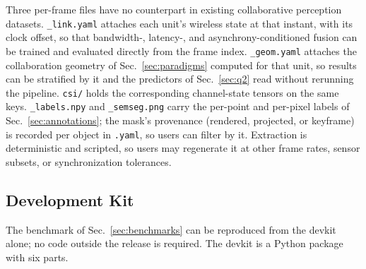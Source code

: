 \documentclass[conference]{IEEEtran}
\begin{document}
Three per-frame files have no counterpart in existing collaborative
perception datasets. \texttt{\_link.yaml} attaches each unit's
wireless state at that instant, with its clock offset, so that
bandwidth-, latency-, and asynchrony-conditioned fusion can be trained
and evaluated directly from the frame index. \texttt{\_geom.yaml}
attaches the collaboration geometry of Sec.~\ref{sec:paradigms}
computed for that unit, so results can be stratified by it and the
predictors of Sec.~\ref{sec:q2} read without rerunning the pipeline.
\texttt{csi/} holds the corresponding channel-state tensors on the
same keys. \texttt{\_labels.npy} and \texttt{\_semseg.png} carry the
per-point and per-pixel labels of Sec.~\ref{sec:annotations}; the
mask's provenance (rendered, projected, or keyframe) is recorded per
object in \texttt{.yaml}, so users can filter by it. Extraction is
deterministic and scripted, so users may regenerate it at other frame
rates, sensor subsets, or synchronization tolerances.



\subsection{Development Kit}
\label{sec:devkit}
The benchmark of Sec.~\ref{sec:benchmarks} can be reproduced from the
devkit alone; no code outside the release is required. The devkit is
a Python package with six parts.
\end{document}
